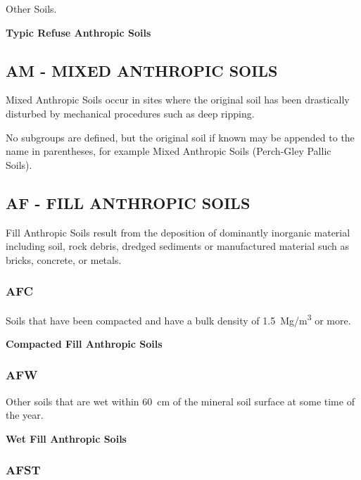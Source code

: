 \documentclass[
  letterpaper,
  DIV=11,
  numbers=noendperiod]{scrreprt}
\begin{document}
Other Soils.

\textbf{Typic Refuse Anthropic Soils}

\hypertarget{sec-AM}{%
\subsection{\texorpdfstring{\textbf{AM} - MIXED ANTHROPIC
SOILS}{AM - MIXED ANTHROPIC SOILS}}\label{sec-AM}}

Mixed Anthropic Soils occur in sites where the original soil has been
drastically disturbed by mechanical procedures such as deep ripping.

No subgroups are defined, but the original soil if known may be appended
to the name in parentheses, for example Mixed Anthropic Soils
(Perch-Gley Pallic Soils).

\hypertarget{sec-AF}{%
\subsection{\texorpdfstring{\textbf{AF} - FILL ANTHROPIC
SOILS}{AF - FILL ANTHROPIC SOILS}}\label{sec-AF}}

Fill Anthropic Soils result from the deposition of dominantly inorganic
material including soil, rock debris, dredged sediments or manufactured
material such as bricks, concrete, or metals.

\hypertarget{sec-key-AFC}{%
\subsubsection{\texorpdfstring{\textbf{AFC}}{AFC}}\label{sec-key-AFC}}

Soils that have been compacted and have a bulk density of
1.5~Mg/m\textsuperscript{3} or more.

\textbf{Compacted Fill Anthropic Soils}

\hypertarget{sec-key-FWT}{%
\subsubsection{\texorpdfstring{\textbf{AFW}}{AFW}}\label{sec-key-FWT}}

Other soils that are wet within 60~cm of the mineral soil surface at
some time of the year.

\textbf{Wet Fill Anthropic Soils}

\hypertarget{sec-key-AFST}{%
\subsubsection{\texorpdfstring{\textbf{AFST}}{AFST}}\label{sec-key-AFST}}
\end{document}
